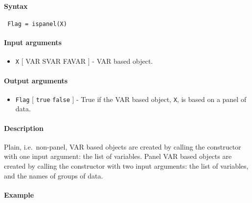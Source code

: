 


	\paragraph{Syntax}
 
 \begin{verbatim}
 Flag = ispanel(X)
 \end{verbatim}
 
 \paragraph{Input arguments}
 
 \begin{itemize}
 \item
   \texttt{X} {[} VAR \textbar{} SVAR \textbar{} FAVAR {]} - VAR based
   object.
 \end{itemize}
 
 \paragraph{Output arguments}
 
 \begin{itemize}
 \item
   \texttt{Flag} {[} \texttt{true} \textbar{} \texttt{false} {]} - True
   if the VAR based object, \texttt{X}, is based on a panel of data.
 \end{itemize}
 
 \paragraph{Description}
 
 Plain, i.e.~non-panel, VAR based objects are created by calling the
 constructor with one input argument: the list of variables. Panel VAR
 based objects are created by calling the constructor with two input
 arguments: the list of variables, and the names of groups of data.
 
 \paragraph{Example}


